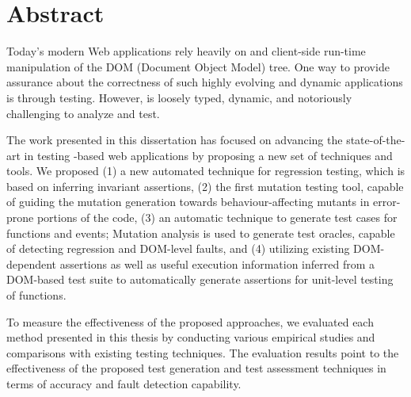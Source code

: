
\chapter{Abstract}
Today's modern Web applications rely heavily on \javascript and client-side run-time manipulation of the DOM (Document Object Model) tree. One way to provide assurance about the correctness of such highly evolving and dynamic applications is through testing. However, \javascript is loosely typed, dynamic, and notoriously challenging to analyze and test.

The work presented in this dissertation has focused on advancing the state-of-the-art in testing \javascript-based web applications by proposing a new set of techniques and tools. We proposed (1) a new automated technique for \javascript regression testing, which is based on inferring invariant assertions, (2) the first \javascript mutation testing tool, capable of guiding the mutation generation towards behaviour-affecting mutants in error-prone portions of the code, (3) an automatic technique to generate test cases for \javascript functions and events; Mutation analysis is used to generate test oracles, capable of detecting regression \javascript and DOM-level faults, and (4) utilizing existing DOM-dependent assertions as well as useful execution information inferred from a DOM-based test suite to automatically generate assertions for unit-level testing of \javascript functions.

To measure the effectiveness of the proposed approaches, we evaluated each method presented in this thesis by conducting various empirical studies and comparisons with existing testing techniques. The evaluation results point to the effectiveness of the proposed test generation and test assessment techniques in terms of accuracy and fault detection capability.


%
%

